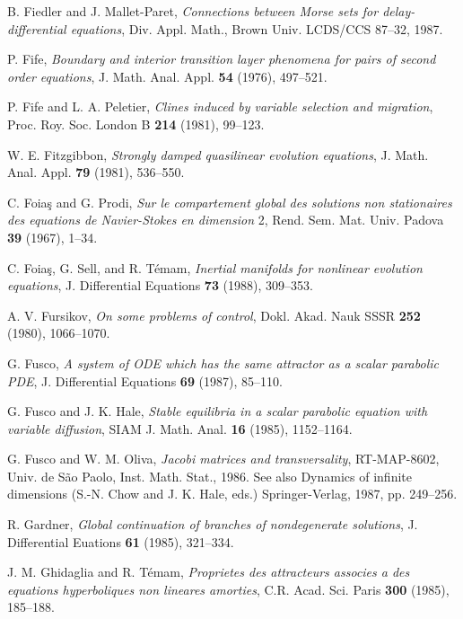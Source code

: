 \documentclass{surv-l}
\theoremstyle{plain}
\theoremstyle{definition}
\numberwithin{equation}{section}
\numberwithin{figure}{chapter}
\begin{document}
\begin{thebibliography}{}
 B. Fiedler and J. Mallet-Paret, \emph{Connections between Morse sets for delay-differential equations}, Div. Appl. Math., Brown Univ. LCDS/CCS 87--32, 1987.

 P. Fife, \emph{Boundary and interior transition layer phenomena for pairs of second order equations}, J. Math. Anal. Appl. \textbf{54} (1976), 497--521.

 P. Fife and L. A. Peletier, \emph{Clines induced by variable selection and migration}, Proc. Roy. Soc. London B \textbf{214} (1981), 99--123.

 W. E. Fitzgibbon, \emph{Strongly damped quasilinear evolution equations}, J. Math. Anal. Appl. \textbf{79} (1981), 536--550.

 C. Foia\c{s} and G. Prodi, \emph{Sur le compartement global des solutions non stationaires des equations de Navier-Stokes en dimension} 2, Rend. Sem. Mat. Univ. Padova \textbf{39} (1967), 1--34.

 C. Foia\c{s}, G. Sell, and R. T\'{e}mam, \emph{Inertial manifolds for nonlinear evolution equations}, J. Differential Equations \textbf{73} (1988), 309--353.


 A. V. Fursikov, \emph{On some problems of control}, Dokl. Akad. Nauk SSSR \textbf{252}
(1980), 1066--1070.

G. Fusco, \emph{A system of ODE which has the same attractor as a scalar parabolic PDE}, J. Differential Equations \textbf{69} (1987), 85--110.

G. Fusco and J. K. Hale, \emph{Stable equilibria in a scalar parabolic equation with}
\emph{variable diffusion}, SIAM J. Math. Anal. \textbf{16} (1985), 1152--1164.

G. Fusco and W. M. Oliva, \emph{Jacobi matrices and transversality}, RT-MAP-8602, Univ. de S\~{a}o Paolo, Inst. Math.
Stat., 1986. See also Dynamics of infinite dimensions (S.-N. Chow and J. K.
Hale, eds.) Springer-Verlag, 1987, pp. 249--256.

R. Gardner, \emph{Global continuation of branches of nondegenerate solutions}, J.
Differential Euations \textbf{61} (1985), 321--334.

J. M. Ghidaglia and R. T\'{e}mam, \emph{Proprietes des attracteurs associes a des equations hyperboliques non lineares amorties}, C.R. Acad. Sci. Paris \textbf{300} (1985),
185--188.


\end{thebibliography}
\end{document}
